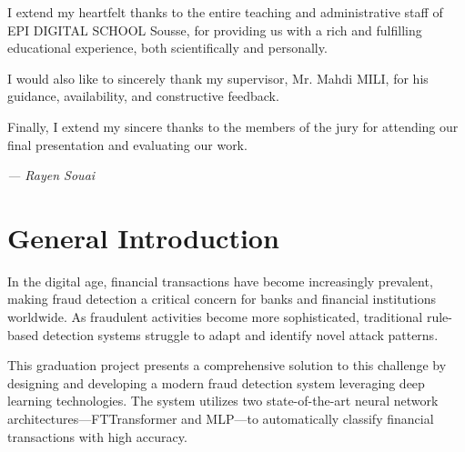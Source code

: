 \documentclass[12pt,a4paper,twoside]{report}
\begin{document}
I extend my heartfelt thanks to the entire teaching and administrative staff of EPI DIGITAL SCHOOL Sousse, for providing us with a rich and fulfilling educational experience, both scientifically and personally.

I would also like to sincerely thank my supervisor, Mr. Mahdi MILI, for his guidance, availability, and constructive feedback.

Finally, I extend my sincere thanks to the members of the jury for attending our final presentation and evaluating our work.

\vfill

\noindent \textit{--- Rayen Souai}

\newpage
\tableofcontents
\newpage

\listoffigures
\newpage

\listoftables
\newpage

\chapter*{General Introduction}

In the digital age, financial transactions have become increasingly prevalent, making fraud detection a critical concern for banks and financial institutions worldwide. As fraudulent activities become more sophisticated, traditional rule-based detection systems struggle to adapt and identify novel attack patterns.

This graduation project presents a comprehensive solution to this challenge by designing and developing a modern fraud detection system leveraging deep learning technologies. The system utilizes two state-of-the-art neural network architectures—FTTransformer and MLP—to automatically classify financial transactions with high accuracy.
\end{document}
